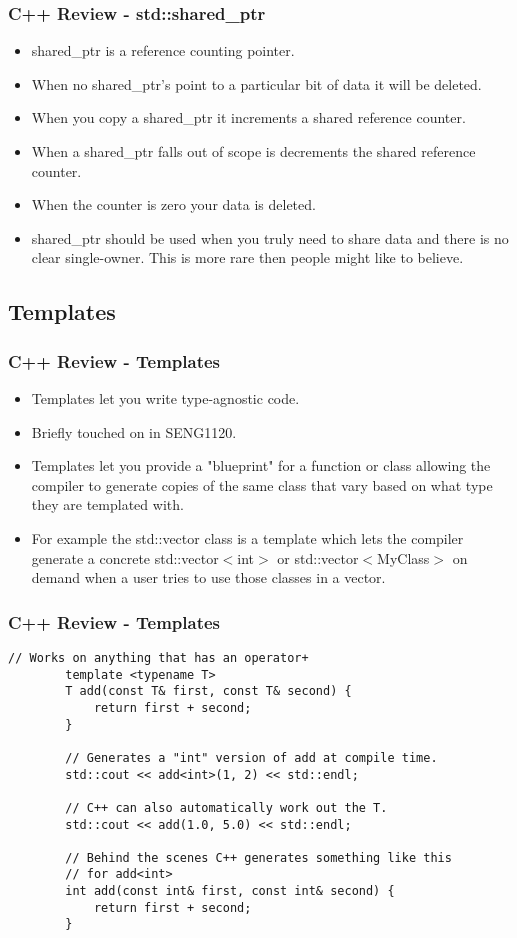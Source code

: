 \documentclass{beamer}
\begin{document}
\begin{frame}[fragile]
	\frametitle{C++ Review - std::shared\_ptr}
	\begin{itemize}
		\item shared\_ptr is a reference counting pointer.
		\item When no shared\_ptr's point to a particular bit of data it will be deleted.
		\item When you copy a shared\_ptr it increments a shared reference counter. 
		\item When a shared\_ptr falls out of scope is decrements the shared reference counter.
		\item When the counter is zero your data is deleted.
		\item shared\_ptr should be used when you truly need to share data and there is no clear single-owner. 
			This is more rare then people might like to believe.
	\end{itemize}
\end{frame}

\subsection{Templates}
\begin{frame}
	\frametitle{C++ Review - Templates}
	\begin{itemize}
		\item Templates let you write type-agnostic code.
		\item Briefly touched on in SENG1120.
		\item Templates let you provide a "blueprint" for a function or class allowing the compiler to generate
			copies of the same class that vary based on what type they are templated with.
		\item For example the std::vector class is a template which lets the compiler generate a concrete
			std::vector$<$int$>$ or std::vector$<$MyClass$>$ on demand when a user tries to use those classes 
			in a vector.
	\end{itemize}
\end{frame}

\begin{frame}[fragile]
	\frametitle{C++ Review - Templates}
	\begin{lstlisting}[language=nuclear]
		// Works on anything that has an operator+
		template <typename T>
		T add(const T& first, const T& second) {
		    return first + second;
		}
		
		// Generates a "int" version of add at compile time.
		std::cout << add<int>(1, 2) << std::endl;

		// C++ can also automatically work out the T.
		std::cout << add(1.0, 5.0) << std::endl;

		// Behind the scenes C++ generates something like this
		// for add<int>
		int add(const int& first, const int& second) {
		    return first + second;
		}
	\end{lstlisting}
\end{frame}
\end{document}
